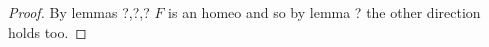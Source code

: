 
\begin{proof}
By lemmas ?,?,? $F$ is an homeo and so by lemma ? the other direction holds too.
\end{proof}